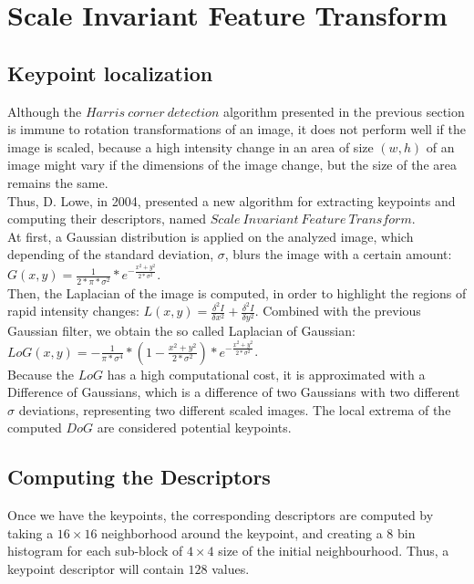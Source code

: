 \section{Scale Invariant Feature Transform}
\subsection{Keypoint localization}
Although the $Harris\ corner\ detection$ algorithm presented in the previous section is immune to rotation transformations of an image, it does not perform well if the image is scaled, because a high intensity change in an area of size $(w, h)$ of an image might vary if the dimensions of the image change, but the size of the area remains the same.\\
Thus, D. Lowe, in 2004, presented a new algorithm for extracting keypoints and computing their descriptors, named $Scale\ Invariant\ Feature\ Transform$.\\
At first, a Gaussian distribution is applied on the analyzed image, which depending of the standard deviation, $\sigma$, blurs the image with a certain amount: $G(x, y) = \frac{1}{2 * \pi * \sigma^2} * e^{-\frac{x^2 + y^2}{2 * \sigma^2}}$.\\
Then, the Laplacian of the image is computed, in order to highlight the regions of rapid intensity changes: $L(x, y) = \frac{\delta^2 I}{\delta x^2} + \frac{\delta^2 I}{\delta y^2}$. Combined with the previous Gaussian filter, we obtain the so called Laplacian of Gaussian: $LoG(x, y) = -\frac{1}{\pi * \sigma^4} * \left(1 - \frac{x^2 + y^2}{2 * \sigma^2}\right) * e^{-\frac{x^2 + y^2}{2 * \sigma^2}}$.\\
Because the $LoG$ has a high computational cost, it is approximated with a Difference of Gaussians, which is a difference of two Gaussians with two different $\sigma$ deviations, representing two different scaled images. The local extrema of the computed $DoG$ are considered potential keypoints.
\subsection{Computing the Descriptors}
Once we have the keypoints, the corresponding descriptors are computed by taking a $16\times16$ neighborhood around the keypoint, and creating a $8$ bin histogram for each sub-block of $4\times4$ size of the initial neighbourhood. Thus, a keypoint descriptor will contain $128$ values.

